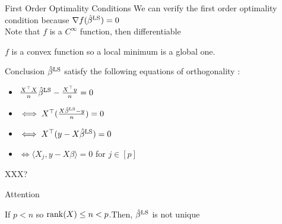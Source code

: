 \documentclass[unknownkeysallowed]{beamer}
\begin{document}
\begin{frame}
\begin{alertblock}{First Order Optimality Conditions}
We can verify the first order optimality condition because $\nabla{f(\hat\beta^{\rm LS})}=0$
\\
Note that $f$ is a $C^{\infty}$ function, then differentiable

\end{alertblock}
\rem $f$ is a convex function so a local minimum is a global one.

\begin{block}{Conclusion}
$\hat\beta^{\rm LS}$ satisfy the following equations of orthogonality :
\begin{itemize}
        \item $\frac{X^{\top}X}{n}\hat\beta^{\rm LS}-\frac{X^{\top}y}{n}=0$
        \item $\iff X^{\top}(\frac{X\hat\beta^{\rm LS}-y}{n})=0$
        \item $\iff X^{\top}(y-X\hat\beta^{\rm LS})=0$
        \item $\iff \langle X_{j},y-X\beta\rangle=0$ for $ j \in [p]$
    \end{itemize}
\end{block}
\end{frame}


\begin{frame}{XXX?} %
\begin{block}{Attention}

If $p < n$ so ${\rm rank}(X) \leq n < p$.Then, $\hat{\beta}^{\rm LS}$ is not unique

\end{block}
\end{frame}
\end{document}
